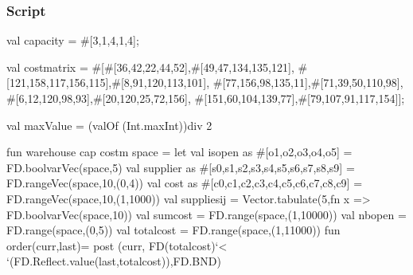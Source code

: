 \documentclass[a4paper,halfparskip]{scrartcl}
\begin{document}
\subsubsection{Script}
\begin{myverbatim}
val capacity = #[3,1,4,1,4];

val costmatrix = 
    #[#[36,42,22,44,52],#[49,47,134,135,121],
      #[121,158,117,156,115],#[8,91,120,113,101],
      #[77,156,98,135,11],#[71,39,50,110,98],
      #[6,12,120,98,93],#[20,120,25,72,156],
      #[151,60,104,139,77],#[79,107,91,117,154]];
                   
val maxValue = (valOf (Int.maxInt))div 2

fun warehouse cap costm space =
    let
       val isopen as #[o1,o2,o3,o4,o5] = 
                          FD.boolvarVec(space,5)
       val supplier as #[s0,s1,s2,s3,s4,s5,s6,s7,s8,s9] = 
                          FD.rangeVec(space,10,(0,4))
       val cost as #[c0,c1,c2,c3,c4,c5,c6,c7,c8,c9] = 
                          FD.rangeVec(space,10,(1,1000))
       val suppliesij = Vector.tabulate(5,fn x => 
                          FD.boolvarVec(space,10))
       val sumcost = FD.range(space,(1,10000))
       val nbopen = FD.range(space,(0,5))
       val totalcost = FD.range(space,(1,11000))
       fun order(curr,last)=
           post (curr, FD(totalcost)`< 
                 `(FD.Reflect.value(last,totalcost)),FD.BND)
                  

\end{myverbatim}
\end{document}
